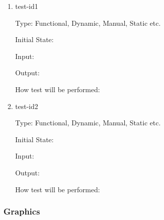 \documentclass[12pt, titlepage]{article}
\begin{document}
\begin{enumerate}

\item{test-id1\\}

Type: Functional, Dynamic, Manual, Static etc.
					
Initial State: 
					
Input: 
					
Output: 
					
How test will be performed: 
					
\item{test-id2\\}

Type: Functional, Dynamic, Manual, Static etc.
					
Initial State: 
					
Input: 
					
Output: 
					
How test will be performed: 

\end{enumerate}

\subsubsection{Graphics}
\end{document}
